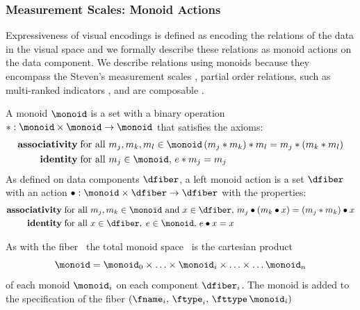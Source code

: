 \documentclass[../main.tex]{subfiles}
\begin{document}
\subsubsection{Measurement Scales: Monoid Actions}
\label{sec:math:data:monoid}
Expressiveness of visual encodings is defined as encoding the relations of the data in the visual space \cite{mackinlayAutomatingDesignGraphical1986} and we formally describe these relations as monoid actions on the data component. We describe relations using monoids because they encompass the Steven's measurement scales \cite{stevensTheoryScalesMeasurement1946,leaFormalizationMeasurementScale}, partial order relations, such as multi-ranked indicators \cite{bruggemannRankingPrioritizationMultiindicator2011}, and are composable \cite{yorgeyMonoidsThemeVariations}. 

A monoid \cite{Monoid2021} $\monoid$ is a set with a binary operation $\ast:\monoid \times \monoid\rightarrow \monoid$ that satisfies the axioms:
\begin{align}
    \textbf{associativity}\; & \text{for all } m_j, m_k, m_l \in \monoid \, (m_j \ast m_k) \ast m_l = m_j \ast (m_k \ast m_l)\\
    \textbf{identity}\; & \text{for all } m_j\in \monoid,\,  e\ast m_j = m_j 
\end{align} 
As defined on data components $\dfiber$, a left monoid action \cite{SemigroupAction2021,nlabauthorsAction2021} is a set $\dfiber$ with an action $\bullet: \monoid\times \dfiber \rightarrow \dfiber$ with the properties:
\begin{align}
    \textbf{associativity}\;& \text{for all } m_j, m_k \in \monoid \text{ and } x\in \dfiber,\, m_j\bullet(m_k\bullet x) = (m_j\ast m_k) \bullet x\label{eq:math:data:monoid:asso}\\
    \textbf{identity}\;& \text{for all } x\in \dfiber,\; e\in \monoid,\,  e\bullet x = x \label{eq:math:data:monoid:identity}
\end{align}

As with the fiber \dfiber\, the total monoid space \monoid\ is the cartesian product
\begin{equation}
    \label{eq:math:data:monoid:decompose}
\monoid= \monoid_{0} \times \ldots \times \monoid_{i}\times \ldots \times\ldots \monoid_{n}
\end{equation}
of each monoid \(\monoid_{i}\) on each component \(\dfiber_{i}\).  The monoid is added to the specification of the fiber \((\fname_i,\, \ftype_i,\, \fttype\, \monoid_i)\)
\end{document}
